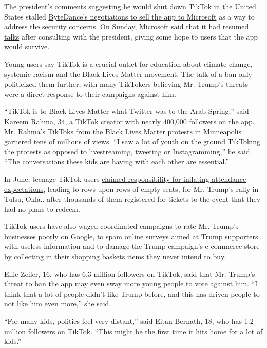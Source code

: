 The president's comments suggesting he would shut down TikTok in the
United States stalled
\href{https://www.nytimes3xbfgragh.onion/2020/08/03/technology/tiktok-trump-sale-microsoft.html}{ByteDance's
negotiations to sell the app to Microsoft} as a way to address the
security concerns. On Sunday,
\href{https://www.nytimes3xbfgragh.onion/2020/08/02/business/economy/trump-tiktok-china-national-security.html}{Microsoft
said that it had resumed talks} after consulting with the president,
giving some hope to users that the app would survive.

Young users say TikTok is a crucial outlet for education about climate
change, systemic racism and the Black Lives Matter movement. The talk of
a ban only politicized them further, with many TikTokers believing Mr.
Trump's threats were a direct response to their campaigns against him.

``TikTok is to Black Lives Matter what Twitter was to the Arab Spring,''
said Kareem Rahma, 34, a TikTok creator with nearly 400,000 followers on
the app. Mr. Rahma's TikToks from the Black Lives Matter protests in
Minneapolis garnered tens of millions of views. ``I saw a lot of youth
on the ground TikToking the protests as opposed to livestreaming,
tweeting or Instagramming,'' he said. ``The conversations these kids are
having with each other are essential.''

In June, teenage TikTok users
\href{https://www.nytimes3xbfgragh.onion/2020/06/21/style/tiktok-trump-rally-tulsa.html}{claimed
responsibility for inflating attendance expectations}, leading to rows
upon rows of empty seats, for Mr. Trump's rally in Tulsa, Okla., after
thousands of them registered for tickets to the event that they had no
plans to redeem.

TikTok users have also waged coordinated campaigns to rate Mr. Trump's
businesses poorly on Google, to spam online surveys aimed at Trump
supporters with useless information and to damage the Trump campaign's
e-commerce store by collecting in their shopping baskets items they
never intend to buy.

Ellie Zeiler, 16, who has 6.3 million followers on TikTok, said that Mr.
Trump's threat to ban the app may even sway more
\href{https://www.nbcnews.com/news/us-news/trump-s-threatened-tiktok-ban-could-motivate-young-users-vote-n1235587}{young
people to vote against him}. ``I think that a lot of people didn't like
Trump before, and this has driven people to not like him even more,''
she said.

``For many kids, politics feel very distant,'' said Eitan Bernath, 18,
who has 1.2 million followers on TikTok. ``This might be the first time
it hits home for a lot of kids.''

